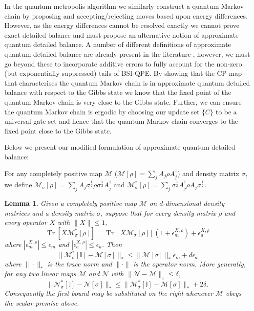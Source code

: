 \documentclass[aps,floatfix,10pt,amssymb,amsfont,amsmath,superscriptaddress,float,nofootinbib,longbibliography,nobalancelastpage,twocolumn]{revtex4-2}
\newtheorem{lemma}{Lemma}
\begin{document}
In the quantum metropolis algorithm we similarly construct a quantum Markov chain by proposing and accepting/rejecting moves based upon energy differences. However, as the energy differences cannot be resolved exactly we cannot prove exact detailed balance and must propose an alternative notion of approximate quantum detailed balance. A number of different definitions of approximate quantum detailed balance are already present in the literature \cite{}, however, we must go beyond these to incorporate additive errors to fully account for the non-zero (but exponentially suppressed) tails of BSI-QPE. By showing that the CP map that characterises the quantum Markov chain is in approximate quantum detailed balance with respect to the Gibbs state we know that the fixed point of the quantum Markov chain is very close to the Gibbs state. Further, we can ensure the quantum Markov chain is ergodic by choosing our update set $\{C\}$ to be a universal gate set \cite{Temme_2011} and hence that the quantum Markov chain converges to the fixed point close to the Gibbs state.

Below we present our modified formulation of approximate quantum detailed balance:

For any completely positive map $\mathcal{M}$ ($\mathcal{M}[\rho] =\sum_{j}  A_{j}\rho  A^{\dagger}_{j}$) and density matrix $\sigma$, we define $\mathcal{M}_{\sigma}[\rho] =\sum_{j}  A_{j}\sigma^{\frac{1}{2}}\rho\sigma^{\frac{1}{2}}  A^{\dagger}_{j}$ and $ \mathcal{M}^*_{\sigma}[\rho] = \sum_{j} \sigma^{\frac{1}{2}}A^{\dagger}_{j}\rho A_{j}\sigma^{\frac{1}{2}}$.
\begin{lemma}
\label{lemma:1}
Given a completely positive map $\mathcal{M}$ on $d$-dimensional density matrices and a density matrix $\sigma$, suppose that for every density matrix $\rho$ and every operator $X$ with $\|X\|\leq1$,
\begin{equation}
    \operatorname{Tr}\left[X \mathcal{M}^*_{\sigma}[\rho]\right] = \operatorname{Tr}\left[X\mathcal{M}_{\sigma}[\rho]\right](1+\epsilon^{X,\rho}_m) + \epsilon^{X,\rho}_a
    \label{eq:approximate_quantum_detailed_balance_condition}
\end{equation}
where $|\epsilon^{X,\rho}_m| \leq \epsilon_m$ and $|\epsilon^{X,\rho}_a| \leq \epsilon_a$. Then
 \begin{equation}
    \|\mathcal{M}^*_{\sigma}[\mathbb{I}]-\mathcal{M}[\sigma] \|_* \leq \|\mathcal{M}[\sigma]\|_*\epsilon_m + d\epsilon_a
    \label{eq:trace_detailed_balance_condition}
\end{equation}
where $\|\cdot\|_*$ is the trace norm and $\|\cdot\|$ is the operator norm. More generally, for any two linear maps $\mathcal{M}$ and $\mathcal{N}$ with $\|\mathcal{N}-\mathcal{M}\|_{\diamond}\leq\delta$,
\begin{equation*}
    \|\mathcal{N}^*_{\sigma}[\mathbb{I}]-\mathcal{N}[\sigma]\|_*
    \leq \|\mathcal{M}^*_{\sigma}[\mathbb{I}]-\mathcal{M}[\sigma]\|_*+2\delta.
\end{equation*}
Consequently the first bound may be substituted on the right whenever
$\mathcal M$ obeys the scalar premise above.
\end{lemma}
\end{document}
